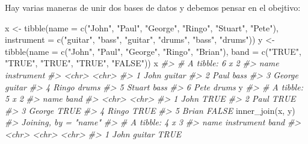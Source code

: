 \documentclass[
]{book}
\newenvironment{Shaded}{\begin{snugshade}}{\end{snugshade}}
\newcommand{\AttributeTok}[1]{\textcolor[rgb]{0.77,0.63,0.00}{#1}}
\newcommand{\CommentTok}[1]{\textcolor[rgb]{0.56,0.35,0.01}{\textit{#1}}}
\newcommand{\FunctionTok}[1]{\textcolor[rgb]{0.00,0.00,0.00}{#1}}
\newcommand{\NormalTok}[1]{#1}
\newcommand{\OtherTok}[1]{\textcolor[rgb]{0.56,0.35,0.01}{#1}}
\newcommand{\StringTok}[1]{\textcolor[rgb]{0.31,0.60,0.02}{#1}}
\begin{document}
Hay varias maneras de unir dos bases de datos y debemos pensar en el
obejtivo:

\begin{Shaded}
\begin{Highlighting}[]
\NormalTok{x }\OtherTok{\textless{}{-}} \FunctionTok{tibble}\NormalTok{(}\AttributeTok{name =} \FunctionTok{c}\NormalTok{(}\StringTok{"John"}\NormalTok{, }\StringTok{"Paul"}\NormalTok{, }\StringTok{"George"}\NormalTok{, }\StringTok{"Ringo"}\NormalTok{, }\StringTok{"Stuart"}\NormalTok{, }\StringTok{"Pete"}\NormalTok{),}
  \AttributeTok{instrument =} \FunctionTok{c}\NormalTok{(}\StringTok{"guitar"}\NormalTok{, }\StringTok{"bass"}\NormalTok{, }\StringTok{"guitar"}\NormalTok{, }\StringTok{"drums"}\NormalTok{, }\StringTok{"bass"}\NormalTok{,}
     \StringTok{"drums"}\NormalTok{))}
\NormalTok{y }\OtherTok{\textless{}{-}} \FunctionTok{tibble}\NormalTok{(}\AttributeTok{name =} \FunctionTok{c}\NormalTok{(}\StringTok{"John"}\NormalTok{, }\StringTok{"Paul"}\NormalTok{, }\StringTok{"George"}\NormalTok{, }\StringTok{"Ringo"}\NormalTok{, }\StringTok{"Brian"}\NormalTok{),}
  \AttributeTok{band =} \FunctionTok{c}\NormalTok{(}\StringTok{"TRUE"}\NormalTok{, }\StringTok{"TRUE"}\NormalTok{, }\StringTok{"TRUE"}\NormalTok{,  }\StringTok{"TRUE"}\NormalTok{, }\StringTok{"FALSE"}\NormalTok{))}
\NormalTok{x}
\CommentTok{\#\textgreater{} \# A tibble: 6 x 2}
\CommentTok{\#\textgreater{}   name   instrument}
\CommentTok{\#\textgreater{}   \textless{}chr\textgreater{}  \textless{}chr\textgreater{}     }
\CommentTok{\#\textgreater{} 1 John   guitar    }
\CommentTok{\#\textgreater{} 2 Paul   bass      }
\CommentTok{\#\textgreater{} 3 George guitar    }
\CommentTok{\#\textgreater{} 4 Ringo  drums     }
\CommentTok{\#\textgreater{} 5 Stuart bass      }
\CommentTok{\#\textgreater{} 6 Pete   drums}
\NormalTok{y}
\CommentTok{\#\textgreater{} \# A tibble: 5 x 2}
\CommentTok{\#\textgreater{}   name   band }
\CommentTok{\#\textgreater{}   \textless{}chr\textgreater{}  \textless{}chr\textgreater{}}
\CommentTok{\#\textgreater{} 1 John   TRUE }
\CommentTok{\#\textgreater{} 2 Paul   TRUE }
\CommentTok{\#\textgreater{} 3 George TRUE }
\CommentTok{\#\textgreater{} 4 Ringo  TRUE }
\CommentTok{\#\textgreater{} 5 Brian  FALSE}
\FunctionTok{inner\_join}\NormalTok{(x, y)}
\CommentTok{\#\textgreater{} Joining, by = "name"}
\CommentTok{\#\textgreater{} \# A tibble: 4 x 3}
\CommentTok{\#\textgreater{}   name   instrument band }
\CommentTok{\#\textgreater{}   \textless{}chr\textgreater{}  \textless{}chr\textgreater{}      \textless{}chr\textgreater{}}
\CommentTok{\#\textgreater{} 1 John   guitar     TRUE }

\end{Highlighting}
\end{Shaded}
\end{document}
